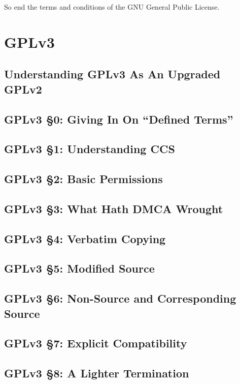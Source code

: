 So end the terms and conditions of the GNU General Public License.

\chapter{GPLv3}

\section{Understanding GPLv3 As An Upgraded GPLv2}

\section{GPLv3 \S 0: Giving In On ``Defined Terms''}

\section{GPLv3 \S 1: Understanding CCS}

\section{GPLv3 \S 2: Basic Permissions}

\section{GPLv3 \S 3: What Hath DMCA Wrought}
\label{GPLv3s3}
\section{GPLv3 \S 4: Verbatim Copying}

\section{GPLv3 \S 5: Modified Source}

\section{GPLv3 \S 6: Non-Source and Corresponding Source}

\section{GPLv3 \S 7: Explicit Compatibility}

\section{GPLv3 \S 8: A Lighter Termination}

